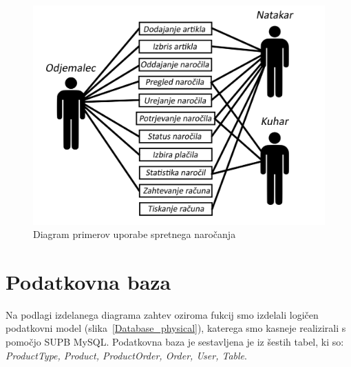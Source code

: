 \documentclass[a4paper, 12pt]{book}
\begin{document}
\begin{figure}[!htb]
\begin{center}
\includegraphics[width=12cm]{Skica2.png}
\end{center}
\caption{Diagram primerov uporabe spretnega naročanja}
\label{FunkVloge}
\end{figure}

 

\section{Podatkovna baza}
Na podlagi izdelanega diagrama zahtev oziroma fukcij smo izdelali logičen podatkovni model (slika~\ref{Database_physical}), katerega smo kasneje realizirali s pomočjo SUPB MySQL. Podatkovna baza je sestavljena je iz šestih tabel, ki so: \textit{ProductType, Product, ProductOrder, Order, User, Table}. 
\end{document}
